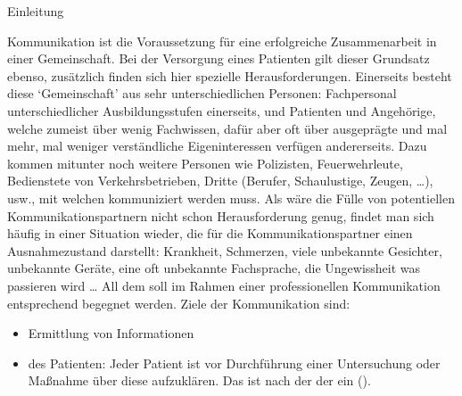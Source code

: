 \Text
{{Einleitung}}%
{%
Kommunikation ist die Voraussetzung für eine erfolgreiche
Zusammenarbeit in einer Gemeinschaft. Bei der Versorgung
eines Patienten gilt dieser Grundsatz ebenso, zusätzlich
finden sich hier spezielle Herausforderungen. Einerseits
besteht diese \enquote*{Gemeinschaft} aus sehr
unterschiedlichen Personen: Fachpersonal unterschiedlicher
Ausbildungsstufen einerseits, und Patienten und Angehörige,
welche zumeist über wenig Fachwissen, dafür aber oft über
ausgeprägte und mal mehr, mal weniger verständliche
Eigeninteressen verfügen andererseits. Dazu kommen mitunter
noch weitere Personen wie Polizisten, Feuerwehrleute,
Bedienstete von Verkehrsbetrieben, Dritte (Berufer,
Schaulustige, Zeugen, \ldots), usw., mit welchen
kommuniziert werden muss. 
Als wäre die Fülle von potentiellen Kommunikationspartnern
nicht schon Herausforderung genug, findet man sich häufig in einer
Situation wieder, die für die Kommunikationspartner einen
Ausnahmezustand darstellt: Krankheit, Schmerzen,
viele unbekannte Gesichter, unbekannte Geräte, eine oft
unbekannte Fachsprache, die Ungewissheit was passieren wird
{\ldots} All dem soll im Rahmen einer professionellen
Kommunikation entsprechend begegnet werden. 
Ziele der Kommunikation sind:

\begin{itemize}
  \item Ermittlung von Informationen
  \item {} des Patienten: Jeder Patient ist vor
  Durchführung einer Untersuchung oder Maßnahme über
  diese aufzuklären.
  Das  ist nach der
   der  ein 
  ().
  

\end{itemize}}
